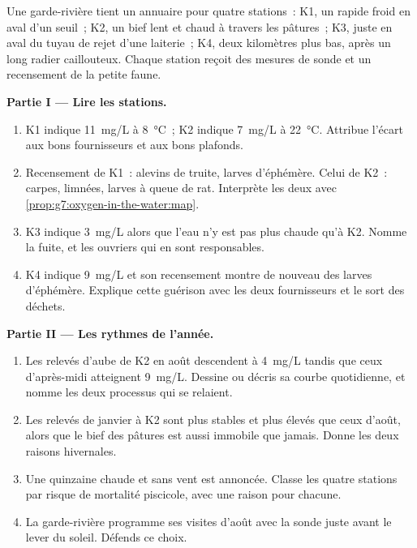 \begin{problem}\label{pb:g7:oxygen-in-the-water:1}
Une garde-rivière tient un annuaire pour quatre stations~: K1, un
rapide froid en aval d'un seuil~; K2, un bief lent et chaud à
travers les pâtures~; K3, juste en aval du tuyau de rejet d'une
laiterie~; K4, deux kilomètres plus bas, après un long radier
caillouteux. Chaque station reçoit des mesures de sonde et un
recensement de la petite faune.

\medskip\noindent\textbf{Partie I --- Lire les stations.}
\begin{enumerate}
  \item K1 indique \qty{11}{mg/L} à
        \qty{8}{\degreeCelsius}~; K2 indique \qty{7}{mg/L} à
        \qty{22}{\degreeCelsius}. Attribue l'écart aux bons
        fournisseurs et aux bons plafonds.
  \item Recensement de K1~: alevins de truite, larves d'éphémère.
        Celui de K2~: carpes, limnées, larves à queue de rat.
        Interprète les deux avec
        \cref{prop:g7:oxygen-in-the-water:map}.
  \item K3 indique \qty{3}{mg/L} alors que l'eau n'y est pas plus
        chaude qu'à K2. Nomme la fuite, et les ouvriers qui en sont
        responsables.
  \item K4 indique \qty{9}{mg/L} et son recensement montre de
        nouveau des larves d'éphémère. Explique cette guérison avec
        les deux fournisseurs et le sort des déchets.
\end{enumerate}

\medskip\noindent\textbf{Partie II --- Les rythmes de l'année.}
\begin{enumerate}[resume]
  \item Les relevés d'aube de K2 en août descendent à
        \qty{4}{mg/L} tandis que ceux d'après-midi atteignent
        \qty{9}{mg/L}. Dessine ou décris sa courbe quotidienne, et
        nomme les deux processus qui se relaient.
  \item Les relevés de janvier à K2 sont plus stables et plus
        élevés que ceux d'août, alors que le bief des pâtures est
        aussi immobile que jamais. Donne les deux raisons
        hivernales.
  \item Une quinzaine chaude et sans vent est annoncée. Classe les
        quatre stations par risque de mortalité piscicole, avec une
        raison pour chacune.
  \item La garde-rivière programme ses visites d'août avec la sonde
        juste avant le lever du soleil. Défends ce choix.
\end{enumerate}


\end{problem}

